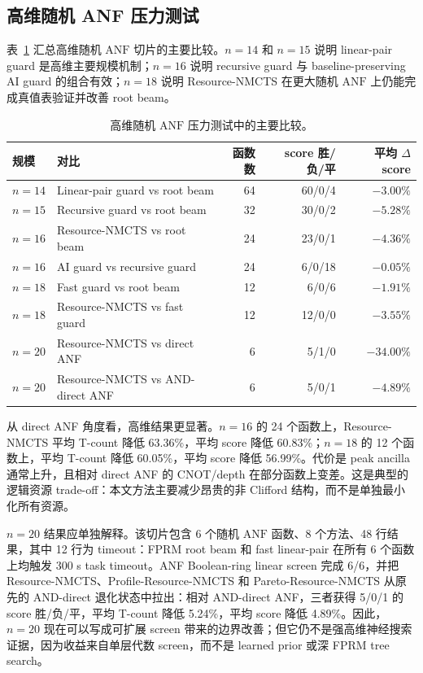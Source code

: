\documentclass[UTF8,fontset=macnew,11pt]{ctexart}
\newcommand{\method}{Resource-NMCTS}
\newcommand{\pareto}{Pareto-Resource-NMCTS}
\newcommand{\anf}{\ensuremath{\mathrm{ANF}}}
\begin{document}
\subsection{高维随机 ANF 压力测试}

表~\ref{tab:highdim} 汇总高维随机 \anf{} 切片的主要比较。$n=14$ 和 $n=15$ 说明 linear-pair guard 是高维主要规模机制；$n=16$ 说明 recursive guard 与 baseline-preserving AI guard 的组合有效；$n=18$ 说明 \method{} 在更大随机 \anf{} 上仍能完成真值表验证并改善 root beam。

\begin{table}[t]
\centering
\small
\caption{高维随机 \anf{} 压力测试中的主要比较。}
\label{tab:highdim}
\begin{tabularx}{\linewidth}{llrrr}
\toprule
规模 & 对比 & 函数数 & score 胜/负/平 & 平均 $\Delta$ score \\
\midrule
$n=14$ & Linear-pair guard vs root beam & 64 & 60/0/4 & $-3.00\%$ \\
$n=15$ & Recursive guard vs root beam & 32 & 30/0/2 & $-5.28\%$ \\
$n=16$ & \method{} vs root beam & 24 & 23/0/1 & $-4.36\%$ \\
$n=16$ & AI guard vs recursive guard & 24 & 6/0/18 & $-0.05\%$ \\
$n=18$ & Fast guard vs root beam & 12 & 6/0/6 & $-1.91\%$ \\
$n=18$ & \method{} vs fast guard & 12 & 12/0/0 & $-3.55\%$ \\
$n=20$ & \method{} vs direct ANF & 6 & 5/1/0 & $-34.00\%$ \\
$n=20$ & \method{} vs AND-direct ANF & 6 & 5/0/1 & $-4.89\%$ \\
\bottomrule
\end{tabularx}
\end{table}

从 direct ANF 角度看，高维结果更显著。$n=16$ 的 24 个函数上，\method{} 平均 T-count 降低 63.36\%，平均 score 降低 60.83\%；$n=18$ 的 12 个函数上，平均 T-count 降低 60.05\%，平均 score 降低 56.99\%。代价是 peak ancilla 通常上升，且相对 direct ANF 的 CNOT/depth 在部分函数上变差。这是典型的逻辑资源 trade-off：本文方法主要减少昂贵的非 Clifford 结构，而不是单独最小化所有资源。

$n=20$ 结果应单独解释。该切片包含 6 个随机 \anf{} 函数、8 个方法、48 行结果，其中 12 行为 timeout：FPRM root beam 和 fast linear-pair 在所有 6 个函数上均触发 300 s task timeout。ANF Boolean-ring linear screen 完成 6/6，并把 \method{}、Profile-\method{} 和 \pareto{} 从原先的 AND-direct 退化状态中拉出：相对 AND-direct ANF，三者获得 5/0/1 的 score 胜/负/平，平均 T-count 降低 5.24\%，平均 score 降低 4.89\%。因此，$n=20$ 现在可以写成可扩展 screen 带来的边界改善；但它仍不是强高维神经搜索证据，因为收益来自单层代数 screen，而不是 learned prior 或深 FPRM tree search。
\end{document}
